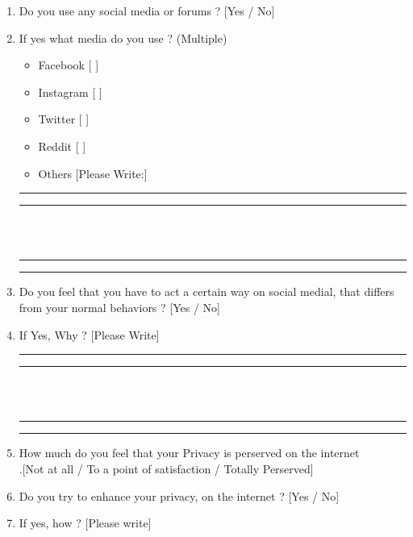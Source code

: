 \documentclass[11pt]{article}
\begin{document}
\begin{enumerate}
    \newpage
    
    \item Do you use any social media or forums ?                   [Yes / No]
    \item If yes what media do you use ? (Multiple)
    \begin{itemize}
        \item Facebook  [ ]
        \item Instagram [ ]
        \item Twitter   [ ]
        \item Reddit    [ ]
        \item Others    [Please Write:]
    \end{itemize}
    
    \begin{left}
        \rule{0.5\textwidth}{.4pt}
    \end{left}
    \begin{left}
        \rule{0.5\textwidth}{.4pt}
    \end{left}\\\\
    \begin{left}
        \rule{0.5\textwidth}{.4pt}
    \end{left}
    \begin{left}
        \rule{0.5\textwidth}{.4pt}
    \end{left}
    
    \item Do you feel that you have to act a certain way on social medial, that differs from your normal behaviors ?                                          [Yes / No]
    \item If Yes, Why ?                                         [Please Write]
    
    \begin{left}
        \rule{0.5\textwidth}{.4pt}
    \end{left}
    \begin{left}
        \rule{0.5\textwidth}{.4pt}
    \end{left}\\\\
    \begin{left}
        \rule{0.5\textwidth}{.4pt}
    \end{left}
    \begin{left}
        \rule{0.5\textwidth}{.4pt}
    \end{left}
    
    \item How much do you feel that your Privacy is perserved on the internet \\
    .[Not at all / To a point of satisfaction / Totally Perserved]
    \item Do you try to enhance your privacy, on the internet ? [Yes / No]
    \item If yes, how ?                                         [Please write]
    

\end{enumerate}
\end{document}
